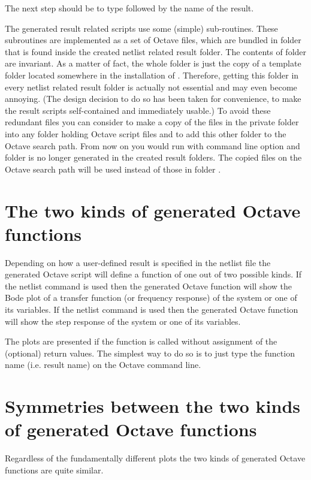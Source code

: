 The next step should be to type  followed by the name of the
result.

The generated result related scripts use some (simple) sub-routines. These
subroutines are implemented as a set of Octave files, which are bundled in
folder  that is found inside the created netlist related
result folder. The contents of folder  are invariant. As a
matter of fact, the whole folder is just the copy of a template folder
located somewhere in the installation of \linnet{}. Therefore, getting
this folder in every netlist related result folder is actually not
essential and may even become annoying. (The design decision to do so has
been taken for convenience, to make the result scripts self-contained and
immediately usable.) To avoid these redundant files you can consider to
make a copy of the files in the private folder into any folder holding
Octave script files and to add this other folder to the Octave search
path. From now on you would run \linnet{} with command line option
 and folder  is no longer generated in the created
result folders. The copied files on the Octave search path will be used
instead of those in folder .


\section{The two kinds of generated Octave functions}

Depending on how a user-defined result is specified in the netlist file
the generated Octave script will define a function of one out of two
possible kinds. If the netlist command  is used then the
generated Octave function will show the Bode plot of a transfer function (or
frequency response) of the system or one of its variables. If the netlist
command  is used then the generated Octave function will show
the step response of the system or one of its variables.

The plots are presented if the function is called without assignment of
the (optional) return values. The simplest way to do so is to just type
the function name (i.e. result name) on the Octave command line.


\section{Symmetries between the two kinds of generated Octave functions}

Regardless of the fundamentally different plots the two kinds of generated
Octave functions are quite similar.

